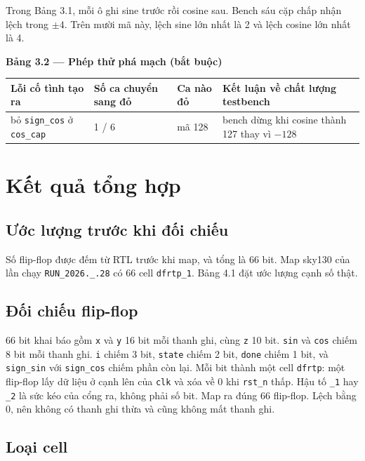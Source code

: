 \documentclass[12pt,a4paper]{article}
\begin{document}
Trong Bảng 3.1, mỗi ô ghi sine trước rồi cosine sau. Bench sáu cặp chấp nhận lệch trong \(\pm 4\). Trên mười mã này, lệch sine lớn nhất là 2 và lệch cosine lớn nhất là 4.

\noindent\textbf{Bảng 3.2 — Phép thử phá mạch (bắt buộc)}

\begin{tabularx}{\textwidth}{|Y|Y|Y|Y|}
\hline
Lỗi cố tình tạo ra & Số ca chuyển sang đỏ & Ca nào đỏ & Kết luận về chất lượng testbench \\ \hline
bỏ \texttt{sign\_cos} ở \texttt{cos\_cap} & 1 / 6 & mã 128 & bench dừng khi cosine thành 127 thay vì \(-128\) \\ \hline
\end{tabularx}

\section{Kết quả tổng hợp}

\subsection{Ước lượng trước khi đối chiếu}

Số flip-flop được đếm từ RTL trước khi map, và tổng là 66 bit. Map sky130 của lần chạy \texttt{RUN\_2026.\_.28} có 66 cell \texttt{dfrtp\_1}. Bảng 4.1 đặt ước lượng cạnh số thật.

\subsection{Đối chiếu flip-flop}

66 bit khai báo gồm \texttt{x} và \texttt{y} 16 bit mỗi thanh ghi, cùng \texttt{z} 10 bit. \texttt{sin} và \texttt{cos} chiếm 8 bit mỗi thanh ghi. \texttt{i} chiếm 3 bit, \texttt{state} chiếm 2 bit, \texttt{done} chiếm 1 bit, và \texttt{sign\_sin} với \texttt{sign\_cos} chiếm phần còn lại. Mỗi bit thành một cell \texttt{dfrtp}: một flip-flop lấy dữ liệu ở cạnh lên của \texttt{clk} và xóa về 0 khi \texttt{rst\_n} thấp. Hậu tố \texttt{\_1} hay \texttt{\_2} là sức kéo của cổng ra, không phải số bit. Map ra đúng 66 flip-flop. Lệch bằng 0, nên không có thanh ghi thừa và cũng không mất thanh ghi.

\subsection{Loại cell}
\end{document}

